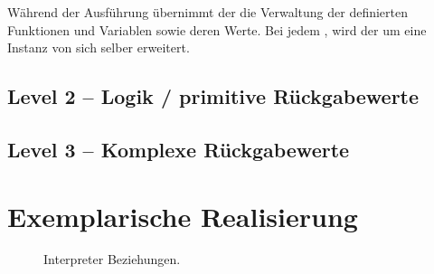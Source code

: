       Während der Ausführung übernimmt der  die Verwaltung der definierten Funktionen und Variablen sowie deren Werte. Bei jedem , wird der  um eine Instanz von sich selber erweitert.

  \subsection{Level 2 -- Logik / primitive Rückgabewerte}
  \label{ssec:Level 2 -- Logik / primitive Rückgabewerte}
  \subsection{Level 3 -- Komplexe Rückgabewerte}
  \label{ssec:Level 3 -- Komplexe Rückgabewerte}

\section{Exemplarische Realisierung}
\label{sec:Exemplarische Realisierung}



  \begin{figure}[H]
    
    \caption{Interpreter Beziehungen.}
    \label{fig:ex_macro}
  \end{figure}


